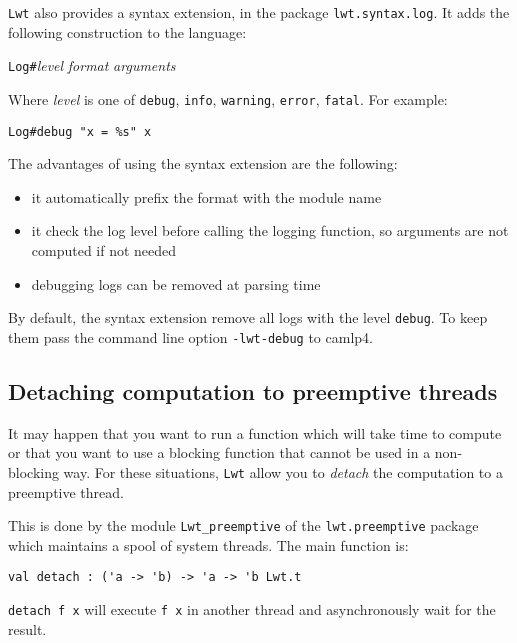 \documentclass{article}
\newcommand{\lwt}{\texttt{Lwt}\xspace}
\begin{document}
\lwt also provides a syntax extension, in the package
\texttt{lwt.syntax.log}. It adds the following construction to the
language:

\begin{center}
  \texttt{Log\#}\textit{level} \textit{format} \textit{arguments}
\end{center}

Where \textit{level} is one of \texttt{debug}, \texttt{info},
\texttt{warning}, \texttt{error}, \texttt{fatal}. For example:

\begin{verbatim}
Log#debug "x = %s" x
\end{verbatim}

The advantages of using the syntax extension are the following:

\begin{itemize}
\item it automatically prefix the format with the module name
\item it check the log level before calling the logging function, so
  arguments are not computed if not needed
\item debugging logs can be removed at parsing time
\end{itemize}

By default, the syntax extension remove all logs with the level
\texttt{debug}. To keep them pass the command line option
\texttt{-lwt-debug} to camlp4.

\subsection{Detaching computation to preemptive threads}

It may happen that you want to run a function which will take time to
compute or that you want to use a blocking function that cannot be
used in a non-blocking way. For these situations, \lwt allow you to
\emph{detach} the computation to a preemptive thread.

This is done by the module \texttt{Lwt\_preemptive} of the
\texttt{lwt.preemptive} package which maintains a spool of system
threads. The main function is:

\begin{verbatim}
val detach : ('a -> 'b) -> 'a -> 'b Lwt.t
\end{verbatim}

\texttt{detach f x} will execute \texttt{f x} in another thread and
asynchronously wait for the result.
\end{document}
